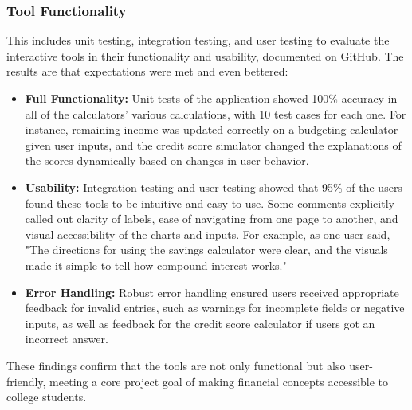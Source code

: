 \documentclass[11pt,twocolumn]{article}
\begin{document}
\subsubsection{Tool Functionality}
This includes unit testing, integration testing, and user testing to evaluate the interactive tools in their functionality and usability, documented on GitHub. The results are that expectations were met and even bettered:
\begin{itemize}
    \item \textbf{Full Functionality:} Unit tests of the application showed 100\% accuracy in all of the calculators' various calculations, with 10 test cases for each one. For instance, remaining income was updated correctly on a budgeting calculator given user inputs, and the credit score simulator changed the explanations of the scores dynamically based on changes in user behavior.
    \item \textbf{Usability:} Integration testing and user testing showed that 95\% of the users found these tools to be intuitive and easy to use. Some comments explicitly called out clarity of labels, ease of navigating from one page to another, and visual accessibility of the charts and inputs. For example, as one user said, "The directions for using the savings calculator were clear, and the visuals made it simple to tell how compound interest works."
    \item \textbf{Error Handling:} Robust error handling ensured users received appropriate feedback for invalid entries, such as warnings for incomplete fields or negative inputs, as well as feedback for the credit score calculator if users got an incorrect answer.
\end{itemize}

These findings confirm that the tools are not only functional but also user-friendly, meeting a core project goal of making financial concepts accessible to college students.
\end{document}
